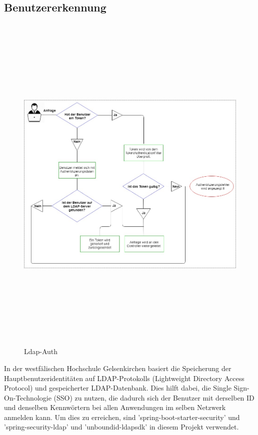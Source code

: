 \documentclass[a4paper,12pt,oneside]{book}
\begin{document}
\subsection{Benutzererkennung}
\begin{figure}[h!]
	\begin{center}
		\includegraphics[width=15cm, height=17cm]{Ldap-Auth.jpg}
		\caption{Ldap-Auth } 
		\label{ Ldap-Auth } 
	\end{center}
\end{figure}
In der westfälischen Hochschule Gelsenkirchen basiert die Speicherung der Hauptbenutzeridentitäten auf LDAP-Protokolls (Lightweight Directory Access Protocol) und gespeicherter LDAP-Datenbank. Dies hilft dabei, die Single Sign-On-Technologie (SSO) zu nutzen, die dadurch sich der Benutzer mit derselben ID und denselben Kennwörtern bei allen Anwendungen im selben Netzwerk anmelden kann. Um dies zu erreichen, sind 'spring-boot-starter-security' und 'spring-security-ldap' und 'unboundid-ldapsdk' in diesem Projekt verwendet.
\end{document}
